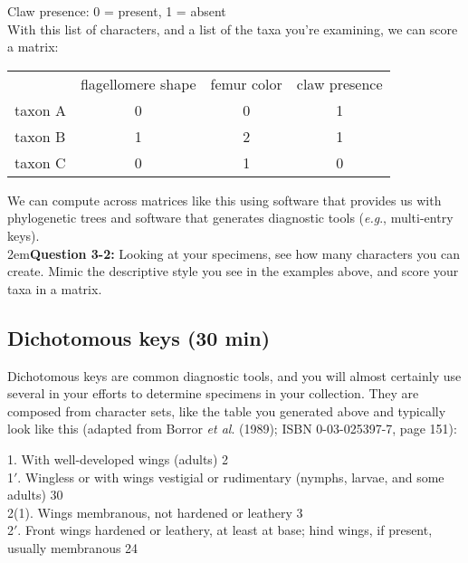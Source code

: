 \documentclass[letterpaper, 11pt]{article}
\begin{document}
Claw presence: 0 = present, 1 = absent\\

With this list of characters, and a list of the taxa you're examining, we can score a matrix:
\begin{table}[H]
\centering
\label{my-label}
\begin{tabular}{lccc}
                             & \multicolumn{1}{l}{flagellomere shape} & \multicolumn{1}{l}{femur color} & \multicolumn{1}{l}{claw presence} \\ \cline{2-4} 
\multicolumn{1}{l|}{taxon A} & \multicolumn{1}{c|}{0}                 & \multicolumn{1}{c|}{0}          & \multicolumn{1}{c|}{1}            \\ \cline{2-4} 
\multicolumn{1}{l|}{taxon B} & \multicolumn{1}{c|}{1}                 & \multicolumn{1}{c|}{2}          & \multicolumn{1}{c|}{1}            \\ \cline{2-4} 
\multicolumn{1}{l|}{taxon C} & \multicolumn{1}{c|}{0}                 & \multicolumn{1}{c|}{1}          & \multicolumn{1}{c|}{0}            \\ \cline{2-4} 
\end{tabular}
\end{table}

\noindent{}We can compute across matrices like this using software that provides us with phylogenetic trees and software that generates diagnostic tools (\textit{e.g}., multi-entry keys).\\

\hangindent2em\textbf{Question 3-2:} Looking at your specimens, see how many characters you can create. Mimic the descriptive style you see in the examples above, and score your taxa in a matrix. \\

\subsection{Dichotomous keys (30 min)}
Dichotomous keys are common diagnostic tools, and you will almost certainly use several in your efforts to determine specimens in your collection. They are composed from character sets, like the table you generated above and typically look like this (adapted from Borror \textit{et al}. (1989); ISBN 0-03-025397-7, page 151):\\

\begin{adjustwidth}{1cm}{}
1. With well-developed wings (adults) \dotfill{} 2\\
1$'$. Wingless or with wings vestigial or rudimentary (nymphs, larvae, and some adults) \dotfill{} 30\\

\noindent{}2(1). Wings membranous, not hardened or leathery \dotfill{} 3\\
2$'$. Front wings hardened or leathery, at least at base; hind wings, if present, usually membranous \dotfill{}24\\
\end{adjustwidth}
\end{document}
